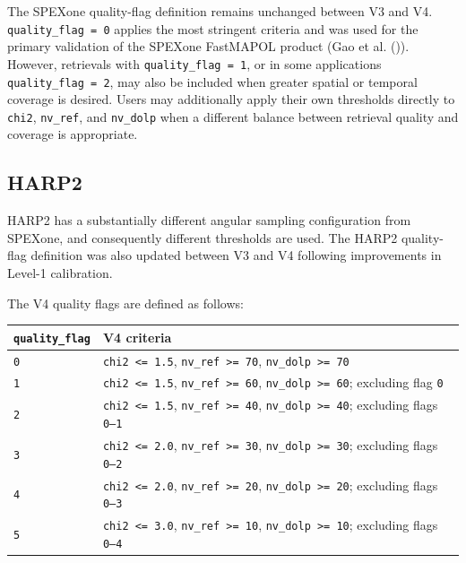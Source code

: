 \documentclass[
  11pt,
  letterpaper,
]{scrreprt}
\begin{document}
The SPEXone quality-flag definition remains unchanged between V3 and V4.
\texttt{quality\_flag\ =\ 0} applies the most stringent criteria and was
used for the primary validation of the SPEXone FastMAPOL product (Gao et
al. ()). However, retrievals with
\texttt{quality\_flag\ =\ 1}, or in some applications
\texttt{quality\_flag\ =\ 2}, may also be included when greater spatial
or temporal coverage is desired. Users may additionally apply their own
thresholds directly to \texttt{chi2}, \texttt{nv\_ref}, and
\texttt{nv\_dolp} when a different balance between retrieval quality and
coverage is appropriate.

\subsection{HARP2}\label{harp2}

HARP2 has a substantially different angular sampling configuration from
SPEXone, and consequently different thresholds are used. The HARP2
quality-flag definition was also updated between V3 and V4 following
improvements in Level-1 calibration.

The V4 quality flags are defined as follows:

\begin{longtable}[]{@{}
  >{\raggedright\arraybackslash}p{}
  >{\raggedright\arraybackslash}p{}@{}}
\toprule\noalign{}
\begin{minipage}[b]{\linewidth}\raggedright
\texttt{quality\_flag}
\end{minipage} & \begin{minipage}[b]{\linewidth}\raggedright
V4 criteria
\end{minipage} \\
\midrule\noalign{}
\endhead
\bottomrule\noalign{}
\endlastfoot
\texttt{0} & \texttt{chi2\ \textless{}=\ 1.5},
\texttt{nv\_ref\ \textgreater{}=\ 70},
\texttt{nv\_dolp\ \textgreater{}=\ 70} \\
\texttt{1} & \texttt{chi2\ \textless{}=\ 1.5},
\texttt{nv\_ref\ \textgreater{}=\ 60},
\texttt{nv\_dolp\ \textgreater{}=\ 60}; excluding flag \texttt{0} \\
\texttt{2} & \texttt{chi2\ \textless{}=\ 1.5},
\texttt{nv\_ref\ \textgreater{}=\ 40},
\texttt{nv\_dolp\ \textgreater{}=\ 40}; excluding flags \texttt{0–1} \\
\texttt{3} & \texttt{chi2\ \textless{}=\ 2.0},
\texttt{nv\_ref\ \textgreater{}=\ 30},
\texttt{nv\_dolp\ \textgreater{}=\ 30}; excluding flags \texttt{0–2} \\
\texttt{4} & \texttt{chi2\ \textless{}=\ 2.0},
\texttt{nv\_ref\ \textgreater{}=\ 20},
\texttt{nv\_dolp\ \textgreater{}=\ 20}; excluding flags \texttt{0–3} \\
\texttt{5} & \texttt{chi2\ \textless{}=\ 3.0},
\texttt{nv\_ref\ \textgreater{}=\ 10},
\texttt{nv\_dolp\ \textgreater{}=\ 10}; excluding flags \texttt{0–4} \\
\end{longtable}
\end{document}
